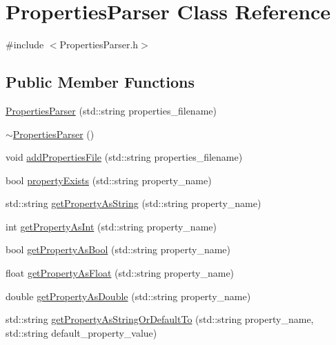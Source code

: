 \hypertarget{class_properties_parser}{}\section{Properties\+Parser Class Reference}
\label{class_properties_parser}


{\ttfamily \#include $<$Properties\+Parser.\+h$>$}

\subsection*{Public Member Functions}
\begin{DoxyCompactItemize}
\item 
\mbox{\hyperlink{class_properties_parser_a9fe7a2c812424ebf8db6c3c5afc50f65}{Properties\+Parser}} (std\+::string properties\+\_\+filename)
\item 
\mbox{\hyperlink{class_properties_parser_a78329eb9c674e1cf5b085d466709a4b6}{$\sim$\+Properties\+Parser}} ()
\item 
void \mbox{\hyperlink{class_properties_parser_a03f177b8082dad1abd2faf60db7a7a6a}{add\+Properties\+File}} (std\+::string properties\+\_\+filename)
\item 
bool \mbox{\hyperlink{class_properties_parser_a8011fb7f2f3f24c59d3c33d56be55033}{property\+Exists}} (std\+::string property\+\_\+name)
\item 
std\+::string \mbox{\hyperlink{class_properties_parser_af52ae62c22c070ab8f286cb29897dc17}{get\+Property\+As\+String}} (std\+::string property\+\_\+name)
\item 
int \mbox{\hyperlink{class_properties_parser_ad4fb34e07c2d93e3cf4daca6f1ed9b14}{get\+Property\+As\+Int}} (std\+::string property\+\_\+name)
\item 
bool \mbox{\hyperlink{class_properties_parser_a4d08af4f4c305273a64c281272011497}{get\+Property\+As\+Bool}} (std\+::string property\+\_\+name)
\item 
float \mbox{\hyperlink{class_properties_parser_acfdb8d26fd4d078aa37ae938adf67379}{get\+Property\+As\+Float}} (std\+::string property\+\_\+name)
\item 
double \mbox{\hyperlink{class_properties_parser_ab7a84135214c45cd91a9bb5377eaff5a}{get\+Property\+As\+Double}} (std\+::string property\+\_\+name)
\item 
std\+::string \mbox{\hyperlink{class_properties_parser_a29d380b8b5dfdf4e3872e02b33bbc765}{get\+Property\+As\+String\+Or\+Default\+To}} (std\+::string property\+\_\+name, std\+::string default\+\_\+property\+\_\+value)

\end{DoxyCompactItemize}
